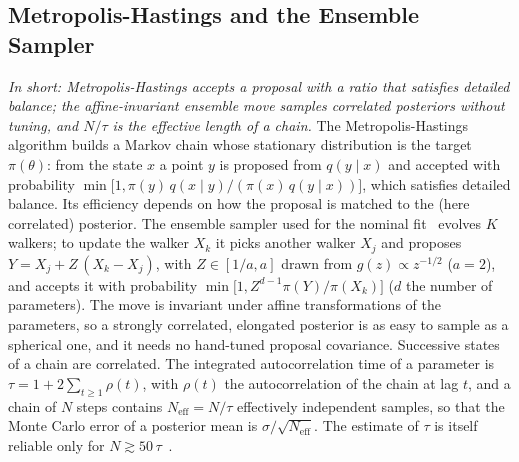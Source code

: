 \subsection{Metropolis-Hastings and the Ensemble Sampler}
\label{app:theory}
\emph{In short: Metropolis-Hastings accepts a proposal with a ratio that satisfies detailed balance; the affine-invariant ensemble move samples correlated posteriors without tuning, and $N/\tau$ is the effective length of a chain.}
The Metropolis-Hastings algorithm builds a Markov chain whose stationary distribution is the target $\pi(\theta)$: from the state $x$ a point $y$ is proposed from $q(y\mid x)$ and accepted with probability $\min\!\big[1,\pi(y)\,q(x\mid y)/(\pi(x)\,q(y\mid x))\big]$, which satisfies detailed balance. Its efficiency depends on how the proposal is matched to the (here correlated) posterior. The ensemble sampler used for the nominal fit~\cite{goodman_weare,emcee} evolves $K$ walkers; to update the walker $X_k$ it picks another walker $X_j$ and proposes $Y=X_j+Z\,(X_k-X_j)$, with $Z\in[1/a,a]$ drawn from $g(z)\propto z^{-1/2}$ ($a=2$), and accepts it with probability $\min\!\big[1,Z^{d-1}\pi(Y)/\pi(X_k)\big]$ ($d$ the number of parameters). The move is invariant under affine transformations of the parameters, so a strongly correlated, elongated posterior is as easy to sample as a spherical one, and it needs no hand-tuned proposal covariance.
Successive states of a chain are correlated. The integrated autocorrelation time of a parameter is $\tau=1+2\sum_{t\geq1}\rho(t)$, with $\rho(t)$ the autocorrelation of the chain at lag $t$, and a chain of $N$ steps contains $N_{\mathrm{eff}}=N/\tau$ effectively independent samples, so that the Monte Carlo error of a posterior mean is $\sigma/\sqrt{N_{\mathrm{eff}}}$. The estimate of $\tau$ is itself reliable only for $N\gtrsim50\,\tau$~\cite{emcee}.
